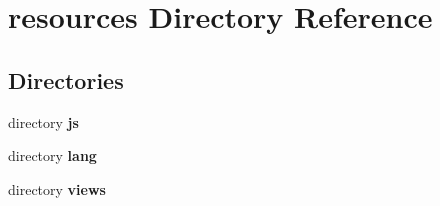 \section{resources Directory Reference}
\label{dir_e3da01c0bbc69dcdd7079bdb347ccb41}
\subsection*{Directories}
\begin{DoxyCompactItemize}
\item 
directory {\bf js}
\item 
directory {\bf lang}
\item 
directory {\bf views}
\end{DoxyCompactItemize}
